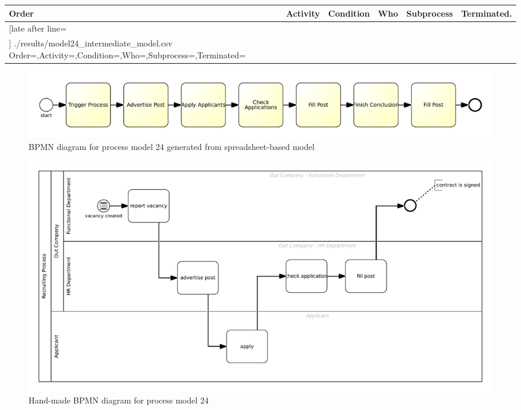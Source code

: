 {\scriptsize
	\begin{longtable}{|p{0.03 \hsize}|p{0.25 \hsize}|p{0.15 \hsize}|p{0.2 \hsize}|p{0.1 \hsize}|p{0.1 \hsize}|}
		\hline
		Order & Activity & Condition & Who & Subprocess & Terminated.
		\\\hline\hline
		\csvreader[late after line=\\\hline]
		{./results/model24_intermediate_model.csv}
		{Order=\Order,Activity=\Activity,Condition=\Condition,Who=\Who,Subprocess=\Subprocess,Terminated=\Terminated}
		{\Order & \Activity & \Condition & \Who & \Subprocess & \Terminated}
		\caption{Spreadsheet-based description for process model 24}
		\label{csv:model24}
	\end{longtable}
}

\begin{figure}[H]
	\centering
	\includegraphics[width=\hsize]{./generated_bpmn/model24.pdf}
	\caption{BPMN diagram for process model 24 generated from spreadsheet-based model}
	\label{bpmn:generated_model24}
\end{figure}

\begin{figure}[H]
	\centering
	\includegraphics[width=\hsize]{./bpmn/model24.pdf}
	\caption{Hand-made BPMN diagram for process model 24}
	\label{bpmn:model24}
\end{figure}

